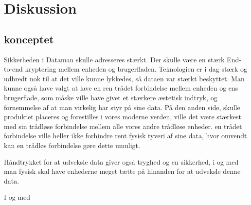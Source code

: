 \section{Diskussion}

\subsection{konceptet}
Sikkerheden i Dataman skulle adresseres stærkt. Der skulle være en stærk End-to-end kryptering mellem enheden og brugerfladen. Teknologien er i dag stærk og udbredt nok til at det ville kunne lykkedes, så dataen var stærkt beskyttet. Man kunne også have valgt at lave en ren trådet forbindelse mellem enheden og ens brugerflade, som måske ville have givet et stærkere æstetisk indtryk, og fornemmelse af at man virkelig har styr på sine data. På den anden side, skulle produktet placeres og forestilles i vores moderne verden, ville det være stærkest med sin trådløse forbindelse mellem alle vores andre trådløse enheder. en trådet forbindelse ville heller ikke forhindre rent fysisk tyveri af sine data, hvor omvendt kan en trådløs forbindelse gøre dette umuligt. 

Håndtrykket for at udveksle data giver også tryghed og en sikkerhed, i og med man fysisk skal have enhederne meget tætte på hinanden for at udveksle denne data. 

I og med 


\begin{comment}
TING AT DISKUTER
    Bruge den teknologi vi har i dag (trådløs)
    
    Hvordan vil dataman ændre vore hverdagoplevelser. Hvordan kandet bruges på nye måder
    HVor er dataman ikke æstetisk (i sin intraktion)
\end{comment}

